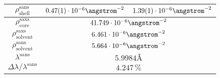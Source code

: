 \documentclass[\main/dresen_thesis.tex]{subfiles}
\begin{document}
\begin{table}[ht]
\begin{tabular}{ c | l | l }
      $\rho_\mathrm{shell}^\mathrm{sans}$
        & $0.47(1) \cdot 10^{-6} \angstrom^{-2}$
        & $1.39(1) \cdot 10^{-6} \angstrom^{-2}$\\
      \hline
      $\rho_\mathrm{core}^\mathrm{saxs}$
        & \multicolumn{2}{c}{$41.749 \cdot 10^{-6} \angstrom^{-2}$}\\
      $\rho_\mathrm{solvent}^\mathrm{saxs}$
        & \multicolumn{2}{c}{$6.461 \cdot 10^{-6} \angstrom^{-2}$}\\
      $\rho_\mathrm{solvent}^\mathrm{sans}$
        & \multicolumn{2}{c}{$5.664 \cdot 10^{-6} \angstrom^{-2}$}\\
      $\lambda^\mathrm{sans}$
        & \multicolumn{2}{c}{$5.9984 \unit{\angstrom}$}\\
      $\Delta \lambda / \lambda ^\mathrm{sans}$
        & \multicolumn{2}{c}{$4.247 \, \%$}\\
      \hline
    \end{tabular}
  \end{table}
\end{document}
